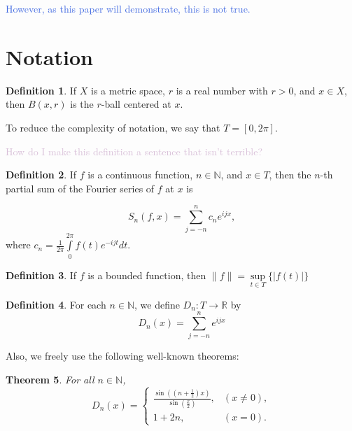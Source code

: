 \documentclass{amsart}
\newcommand{\N}{\mathbb{N}}
\newcommand{\R}{\mathbb{R}}
\newcommand{\colorcomment}[2]{\textcolor{#1}{#2}} %
\newcommand{\absval}[1]{\lvert #1 \rvert}
\newcommand{\norm}[1]{\|#1\|}
\newtheorem{thm}{Theorem}[section]
\theoremstyle{definition}
\newtheorem{definition}[thm]{Definition}
\begin{document}
\colorcomment{RoyalBlue}{However, as this paper will demonstrate, this is not true.}

\section{Notation}

\begin{definition}
If $X$ is a metric space, $r$ is a real number with $r>0$, and $x \in X$, then $B(x,r)$ is the $r$-ball centered at $x$.
\end{definition}

To reduce the complexity of notation, we say that $T = [0, 2 \pi]$.

\colorcomment{Thistle}{How do I make this definition a sentence that isn't terrible?}

\begin{definition}
If $f$ is a continuous function, $n \in \N$, and $x \in T$, then the $n$-th partial sum of the Fourier series of $f$ at $x$ is 

\begin{displaymath}
S_n(f,x) = \sum\limits_{j=-n}^n c_n e^{ijx},
\end{displaymath}
where $c_n = \frac{1}{2 \pi} \int\limits_0^{2\pi} f(t)e^{-ijt} dt$.
\end{definition}

\begin{definition}
If $f$ is a bounded function, then $\norm{f} = \sup\limits_{t \in T} \{\absval{f(t)}\}$
\end{definition}

\begin{definition}
For each $n \in \N$, we define $D_n: T \to \R$ by
\begin{displaymath}
   D_n(x) = \sum\limits_{j=-n}^n e^{ijx}
\end{displaymath} 
\end{definition}

Also, we freely use the following well-known theorems:

\begin{thm}
For all $n \in \N$, 
\begin{displaymath}
   D_n(x) = \left\{
     \begin{array}{lr}
       \frac{\sin((n+\frac{1}{2})x)}{\sin(\frac{x}{2})}, &(x \neq 0),\\
       1+2n, &(x=0).
     \end{array}
   \right.
\end{displaymath}
\end{thm}
\end{document}
